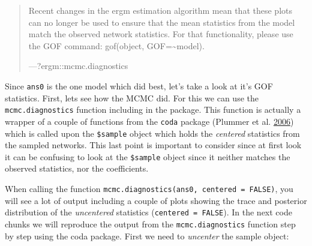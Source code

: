 \documentclass[]{book}
\newenvironment{Shaded}{\begin{snugshade}}{\end{snugshade}}
\newcommand{\KeywordTok}[1]{\textcolor[rgb]{0.13,0.29,0.53}{\textbf{#1}}}
\newcommand{\DataTypeTok}[1]{\textcolor[rgb]{0.13,0.29,0.53}{#1}}
\newcommand{\DecValTok}[1]{\textcolor[rgb]{0.00,0.00,0.81}{#1}}
\newcommand{\StringTok}[1]{\textcolor[rgb]{0.31,0.60,0.02}{#1}}
\newcommand{\CommentTok}[1]{\textcolor[rgb]{0.56,0.35,0.01}{\textit{#1}}}
\newcommand{\OtherTok}[1]{\textcolor[rgb]{0.56,0.35,0.01}{#1}}
\newcommand{\ControlFlowTok}[1]{\textcolor[rgb]{0.13,0.29,0.53}{\textbf{#1}}}
\newcommand{\OperatorTok}[1]{\textcolor[rgb]{0.81,0.36,0.00}{\textbf{#1}}}
\newcommand{\NormalTok}[1]{#1}
\theoremstyle{definition}
\theoremstyle{definition}
\theoremstyle{definition}
\theoremstyle{remark}
\begin{document}
\begin{quote}
Recent changes in the ergm estimation algorithm mean that these plots
can no longer be used to ensure that the mean statistics from the model
match the observed network statistics. For that functionality, please
use the GOF command: gof(object, GOF=\textasciitilde{}model).

---?ergm::mcmc.diagnostics
\end{quote}

Since \texttt{ans0} is the one model which did best, let's take a look
at it's GOF statistics. First, lets see how the MCMC did. For this we
can use the \texttt{mcmc.diagnostics} function including in the package.
This function is actually a wrapper of a couple of functions from the
\texttt{coda} package (Plummer et al.
\protect\hyperlink{ref-R-coda}{2006}) which is called upon the
\texttt{\$sample} object which holds the \emph{centered} statistics from
the sampled networks. This last point is important to consider since at
first look it can be confusing to look at the \texttt{\$sample} object
since it neither matches the observed statistics, nor the coefficients.

When calling the function
\texttt{mcmc.diagnostics(ans0,\ centered\ =\ FALSE)}, you will see a lot
of output including a couple of plots showing the trace and posterior
distribution of the \emph{uncentered} statistics
(\texttt{centered\ =\ FALSE}). In the next code chunks we will reproduce
the output from the \texttt{mcmc.diagnostics} function step by step
using the coda package. First we need to \emph{uncenter} the sample
object:

\begin{Shaded}
\end{Shaded}
\end{document}
